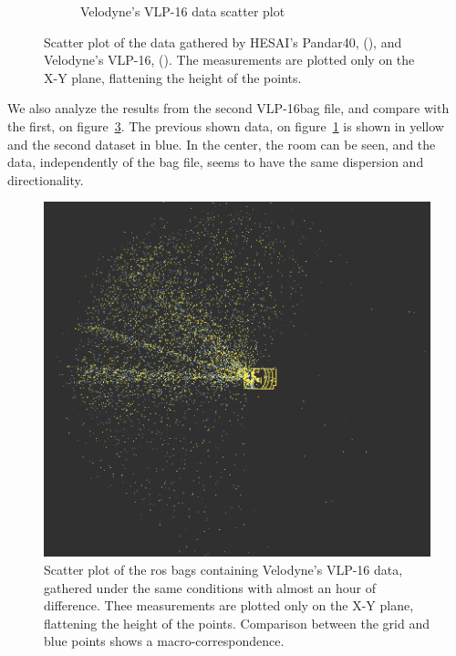 \begin{figure}[ht!]
\begin{subfigure}[t]{0.45\textwidth}
	\caption{Velodyne's VLP-16 data scatter plot}
	\label{fig:bosch-vlp16-1}
\end{subfigure}
\caption{Scatter plot of the data gathered by HESAI's Pandar40, (), and Velodyne's VLP-16, (). The measurements are plotted only on the X-Y plane, flattening the height of the points.}
\label{fig:bosch-pandar-vs-vlp16}
\end{figure}

We also analyze the results from the second VLP-16bag file, and compare with the first, on figure~\ref{fig:bosch-vlp16-comparison}. The previous shown data, on figure~\ref{fig:bosch-vlp16-1} is shown in yellow and the second dataset in blue. In the center, the room can be seen, and the data, independently of the bag file, seems to have the same dispersion and directionality.

\begin{figure}[ht!]
\centering
\includegraphics[scale=0.33]{img/bosch/vlp16-tests-overlaid.png}
\caption{Scatter plot of the \ac{ros} bags containing Velodyne's VLP-16 data, gathered under the same conditions with almost an hour of difference. Thee measurements are plotted only on the X-Y plane, flattening the height of the points. Comparison between the grid and blue points shows a macro-correspondence.}
\label{fig:bosch-vlp16-comparison}
\end{figure}

